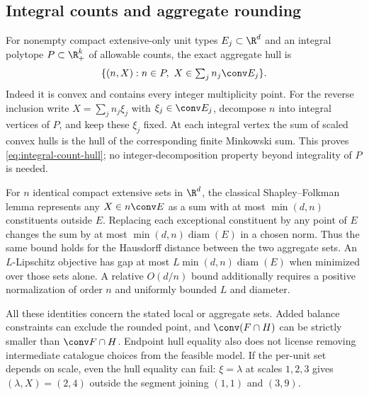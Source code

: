 \subsection{Integral counts and aggregate rounding}
For nonempty compact extensive-only unit types $E_j\subset\R^d$ and an integral polytope
$P\subset\R_+^k$ of allowable counts, the exact aggregate hull is
\begin{equation}\label{eq:integral-count-hull}
 \{(n,X):n\in P,\ X\in\textstyle\sum_j n_j\conv E_j\}.
\end{equation}
Indeed it is convex and contains every integer multiplicity point.
For the reverse inclusion write $X=\sum_j n_j\xi_j$ with
$\xi_j\in\conv E_j$, decompose $n$ into integral vertices of $P$, and
keep these $\xi_j$ fixed. At each integral vertex the sum of scaled
convex hulls is the hull of the corresponding finite Minkowski sum.
This proves \eqref{eq:integral-count-hull}; no integer-decomposition
property beyond integrality of $P$ is needed.

For $n$ identical compact extensive sets in $\R^d$, the classical
Shapley--Folkman lemma \citep[Appendix 2, Lemma 2 and corollary]{Starr1969}
represents any $X\in n\conv E$ as a sum with at most $\min(d,n)$
constituents outside $E$. Replacing each exceptional constituent by any
point of $E$ changes the sum by at most $\min(d,n)\operatorname{diam}(E)$
in a chosen norm. Thus the same bound holds for the Hausdorff distance
between the two aggregate sets. An $L$-Lipschitz objective has gap at most
$L\min(d,n)\operatorname{diam}(E)$ when minimized over those sets alone.
A relative $O(d/n)$ bound additionally requires a positive normalization
of order $n$ and uniformly bounded $L$ and diameter.

All these identities concern the stated local or aggregate sets. Added
balance constraints can exclude the rounded point, and
$\conv(F\cap H)$ can be strictly smaller than $\conv F\cap H$.
Endpoint hull equality also does not license removing intermediate
catalogue choices from the feasible model. If the per-unit set depends
on scale, even the hull equality can fail: $\xi=\lambda$ at scales
$1,2,3$ gives $(\lambda,X)=(2,4)$ outside the segment joining $(1,1)$
and $(3,9)$.
